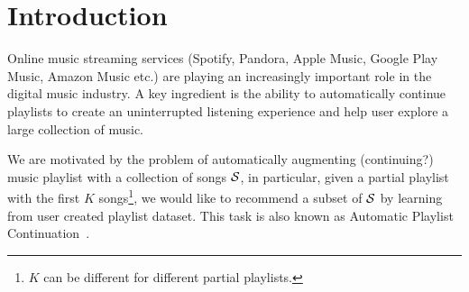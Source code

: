 \section{Introduction}
\label{sec:intro}
Online music streaming services (\eg Spotify, Pandora, Apple Music, Google Play Music, Amazon Music etc.) 
are playing an increasingly important role in the digital music industry.
A key ingredient is the ability to automatically continue playlists 
to create an uninterrupted listening experience and help user explore a large collection of music.

We are motivated by the problem of automatically augmenting (continuing?) music playlist with a collection of songs $\mathcal{S}$,
in particular, given a partial playlist with the first $K$ songs\footnote{$K$ can be different for different partial playlists.},
we would like to recommend a subset of $\mathcal{S}$ by learning from user created playlist dataset.
This task is also known as Automatic Playlist Continuation~\cite{schedl2017,recsysch2018}.
